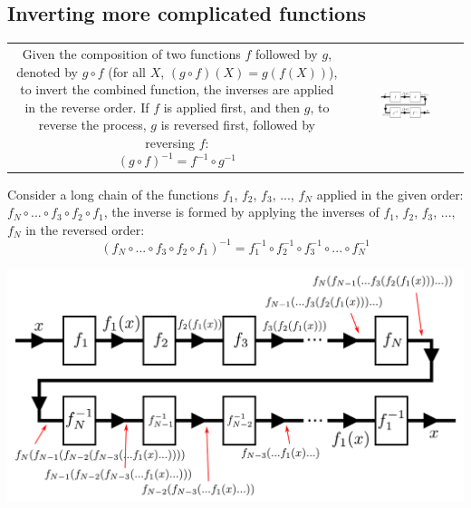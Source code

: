 \documentclass{article}
\begin{document}
\subsection{Inverting more complicated functions}

\begin{tabular}{cc}
\parbox{0.5\textwidth}{ 
Given the composition of two functions \(f\) followed by \(g\), denoted by \(g \circ f\) (for all \(X\), \((g \circ f)(X) = g(f(X))\)), to invert the combined function, the inverses are applied in the reverse order. If \(f\) is applied first, and then \(g\), to reverse the process, \(g\) is reversed first, followed by reversing \(f\):
\[(g \circ f)^{-1} = f^{-1} \circ g^{-1}\]
} & \parbox{0.5\textwidth}{
\includegraphics[width = 0.5\textwidth]{function_box_2_links_inverse} 
}
\end{tabular}

Consider a long chain of the functions \(f_1\), \(f_2\), \(f_3\), ..., \(f_N\) applied in the given order: \(f_N \circ ... \circ f_3 \circ f_2 \circ f_1\), the inverse is formed by applying the inverses of \(f_1\), \(f_2\), \(f_3\), ..., \(f_N\) in the reversed order:
\[(f_N \circ ... \circ f_3 \circ f_2 \circ f_1)^{-1} = f_1^{-1} \circ f_2^{-1} \circ f_3^{-1} \circ ... \circ f_N^{-1}\]

\includegraphics[width = \textwidth]{function_box_chain_inverse} 
\end{document}
